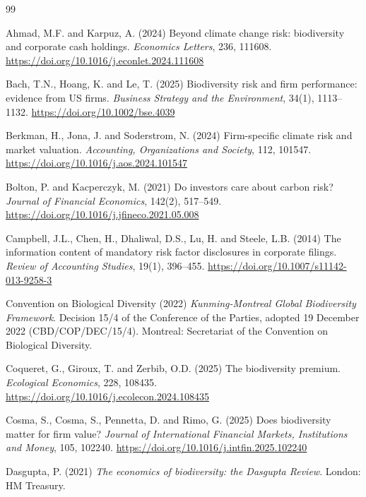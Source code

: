 \documentclass[12pt,a4paper]{article}
\begin{document}
\begin{thebibliography}{99}
\setlength{\itemsep}{2pt}

 Ahmad, M.F. and Karpuz, A. (2024) Beyond climate change risk: biodiversity and corporate cash holdings. \emph{Economics Letters}, 236, 111608. \url{https://doi.org/10.1016/j.econlet.2024.111608}

 Bach, T.N., Hoang, K. and Le, T. (2025) Biodiversity risk and firm performance: evidence from US firms. \emph{Business Strategy and the Environment}, 34(1), 1113--1132. \url{https://doi.org/10.1002/bse.4039}

 Berkman, H., Jona, J. and Soderstrom, N. (2024) Firm-specific climate risk and market valuation. \emph{Accounting, Organizations and Society}, 112, 101547. \url{https://doi.org/10.1016/j.aos.2024.101547}

 Bolton, P. and Kacperczyk, M. (2021) Do investors care about carbon risk? \emph{Journal of Financial Economics}, 142(2), 517--549. \url{https://doi.org/10.1016/j.jfineco.2021.05.008}

 Campbell, J.L., Chen, H., Dhaliwal, D.S., Lu, H. and Steele, L.B. (2014) The information content of mandatory risk factor disclosures in corporate filings. \emph{Review of Accounting Studies}, 19(1), 396--455. \url{https://doi.org/10.1007/s11142-013-9258-3}

 Convention on Biological Diversity (2022) \emph{Kunming-Montreal Global Biodiversity Framework}. Decision 15/4 of the Conference of the Parties, adopted 19 December 2022 (CBD/COP/DEC/15/4). Montreal: Secretariat of the Convention on Biological Diversity.

 Coqueret, G., Giroux, T. and Zerbib, O.D. (2025) The biodiversity premium. \emph{Ecological Economics}, 228, 108435. \url{https://doi.org/10.1016/j.ecolecon.2024.108435}

 Cosma, S., Cosma, S., Pennetta, D. and Rimo, G. (2025) Does biodiversity matter for firm value? \emph{Journal of International Financial Markets, Institutions and Money}, 105, 102240. \url{https://doi.org/10.1016/j.intfin.2025.102240}

 Dasgupta, P. (2021) \emph{The economics of biodiversity: the Dasgupta Review}. London: HM Treasury.


\end{thebibliography}
\end{document}
